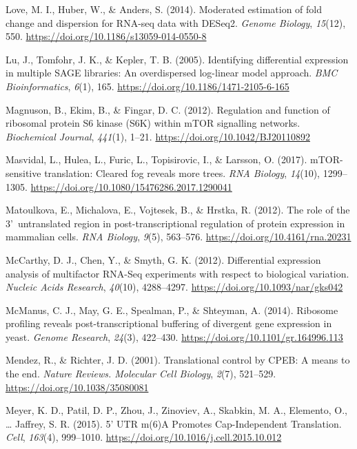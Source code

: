 \documentclass[12pt,openany]{book}
\begin{document}
\hypertarget{ref-Love2014}{}
Love, M. I., Huber, W., \& Anders, S. (2014). Moderated estimation of
fold change and dispersion for RNA-seq data with DESeq2. \emph{Genome
Biology}, \emph{15}(12), 550.
\url{https://doi.org/10.1186/s13059-014-0550-8}

\hypertarget{ref-Lu2005}{}
Lu, J., Tomfohr, J. K., \& Kepler, T. B. (2005). Identifying
differential expression in multiple SAGE libraries: An overdispersed
log-linear model approach. \emph{BMC Bioinformatics}, \emph{6}(1), 165.
\url{https://doi.org/10.1186/1471-2105-6-165}

\hypertarget{ref-Magnuson2012}{}
Magnuson, B., Ekim, B., \& Fingar, D. C. (2012). Regulation and function
of ribosomal protein S6 kinase (S6K) within mTOR signalling networks.
\emph{Biochemical Journal}, \emph{441}(1), 1--21.
\url{https://doi.org/10.1042/BJ20110892}

\hypertarget{ref-Masvidal2017}{}
Masvidal, L., Hulea, L., Furic, L., Topisirovic, I., \& Larsson, O.
(2017). mTOR-sensitive translation: Cleared fog reveals more trees.
\emph{RNA Biology}, \emph{14}(10), 1299--1305.
\url{https://doi.org/10.1080/15476286.2017.1290041}

\hypertarget{ref-Matoulkova2012}{}
Matoulkova, E., Michalova, E., Vojtesek, B., \& Hrstka, R. (2012). The
role of the 3'~untranslated region in post-transcriptional regulation of
protein expression in mammalian cells. \emph{RNA Biology}, \emph{9}(5),
563--576. \url{https://doi.org/10.4161/rna.20231}

\hypertarget{ref-McCarthy2012}{}
McCarthy, D. J., Chen, Y., \& Smyth, G. K. (2012). Differential
expression analysis of multifactor RNA-Seq experiments with respect to
biological variation. \emph{Nucleic Acids Research}, \emph{40}(10),
4288--4297. \url{https://doi.org/10.1093/nar/gks042}

\hypertarget{ref-McManus2014}{}
McManus, C. J., May, G. E., Spealman, P., \& Shteyman, A. (2014).
Ribosome profiling reveals post-transcriptional buffering of divergent
gene expression in yeast. \emph{Genome Research}, \emph{24}(3),
422--430. \url{https://doi.org/10.1101/gr.164996.113}

\hypertarget{ref-Mendez2001}{}
Mendez, R., \& Richter, J. D. (2001). Translational control by CPEB: A
means to the end. \emph{Nature Reviews. Molecular Cell Biology},
\emph{2}(7), 521--529. \url{https://doi.org/10.1038/35080081}

\hypertarget{ref-Meyer2015}{}
Meyer, K. D., Patil, D. P., Zhou, J., Zinoviev, A., Skabkin, M. A.,
Elemento, O., \ldots{} Jaffrey, S. R. (2015). 5' UTR m(6)A Promotes
Cap-Independent Translation. \emph{Cell}, \emph{163}(4), 999--1010.
\url{https://doi.org/10.1016/j.cell.2015.10.012}
\end{document}
